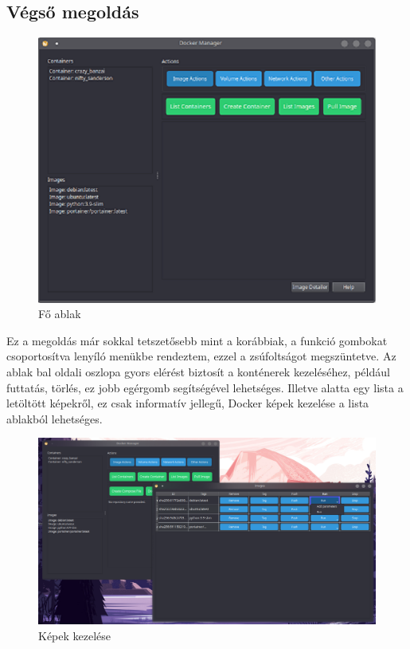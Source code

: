 \subsection{Végső megoldás}
\begin{figure}[H]
	\centering
	\includegraphics[scale=.55]{images/final}
	\caption{Fő ablak}
	\label{fig:final}
\end{figure}
Ez a megoldás már sokkal tetszetősebb mint a korábbiak, a funkció gombokat csoportosítva lenyíló menükbe rendeztem, ezzel a zsúfoltságot megszüntetve. Az ablak bal oldali oszlopa gyors elérést biztosít a konténerek kezeléséhez, például futtatás, törlés, ez jobb egérgomb segítségével lehetséges. Illetve alatta egy lista a letöltött képekről, ez csak informatív jellegű, Docker képek kezelése a lista ablakból lehetséges.  
\begin{figure}[H]
	\centering
	\includegraphics[scale=0.3]{images/final_image-list}
	\caption{Képek kezelése}
	\label{final}
\end{figure}

